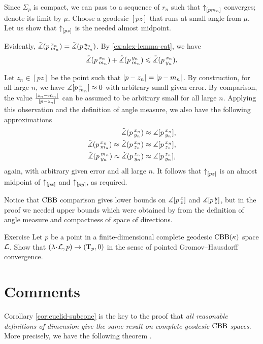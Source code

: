 Since $\Sigma_p$ is compact, we can pass to a sequence of $r_n$ such that 
${\uparrow}_{[{p}{m_n}]}$ converges;
denote its limit by $\mu$.
Choose a geodesic $[pz]$ that runs at small angle from $\mu$.
Let us show that ${\uparrow}_{[{p}{z}]}$ is the needed almost midpoint.

Evidently, $\tilde\measuredangle(p\,{}^{x_n}_{m_n})=\tilde\measuredangle(p\,{}^{y_n}_{m_n})$.
By \ref{ex:alex-lemma-cat}, we have
\[\tilde\measuredangle(p\,{}^{x_n}_{m_n})+\tilde\measuredangle(p\,{}^{y_n}_{m_n})\leqslant \tilde\measuredangle(p\,{}^{x_n}_{y_n}).\]

Let $z_n\in [pz]$ be the point such that $\dist{p}{z_n}{}=\dist{p}{m_n}{}$.
By construction, for all large $n$, we have $\measuredangle[p\,{}^{z}_{m_n}]\approx0$  with arbitrary small given error.
By comparison, the value $\frac{\dist{z_n}{m_n}{}}{\dist{p}{z_n}{}}$ can be assumed to be arbitrary small for all large $n$.
Applying this observation and the definition of angle measure, we also have the following approximations
\begin{align*}
\tilde\measuredangle(p\,{}^{x_n}_{y_n})&\approx \measuredangle[p\,{}^{x_n}_{y_n}],
\\
\tilde\measuredangle(p\,{}^{x_n}_{m_n})\approx\tilde\measuredangle(p\,{}^{x_n}_{z_n})&\approx\measuredangle[p\,{}^{x_n}_{z_n}],
\\
\tilde\measuredangle(p\,{}^{m_n}_{y_n})\approx\tilde\measuredangle(p\,{}^{z_n}_{y_n})&\approx\measuredangle[p\,{}^{z_n}_{y_n}],
\end{align*}
again, with arbitrary given error and all large $n$.
It follows that ${\uparrow}_{[{p}{z}]}$ is an almost midpoint of ${\uparrow}_{[{p}{x}]}$ and ${\uparrow}_{[{p}{y}]}$, as required.
\qeds

Notice that $\mathrm{CBB}$ comparison gives lower bounds on $\measuredangle[p\,{}^{x}_{z}]$ and $\measuredangle[p\,{}^{y}_{z}]$, but in the proof we needed upper bounds which were obtained by from the definition of angle measure and compactness of space of directions.

\begin{thm}{Exercise}
Let $p$ be a point in a finite-dimensional complete geodesic $\mathrm{CBB}(\kappa)$ space $\mathcal{L}$.
Show that $(\lambda\cdot \spc{L},p)\to (\T_p,0)$ in the sense of pointed Gromov--Hausdorff convergence.
\end{thm}

\section{Comments}

Corollary \ref{cor:euclid-subcone} is the key to the proof that \textit{all reasonable definitions of dimension give the same result on complete geodesic $\mathrm{CBB}$ spaces}.
More precisely, we have the following theorem \cite[15.16]{alexander-kapovitch-petrunin2024}.

